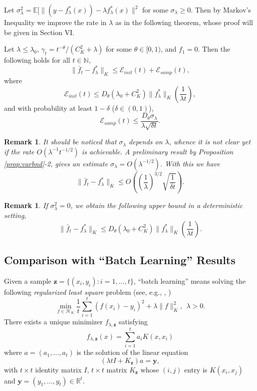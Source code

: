 \documentclass[twoside,twocolumn,journal]{IEEEtran}
\newtheorem{rem}[thm]{Remark}
\newenvironment{mainthm}[1][Main Theorem]{\medskip \noindent {\bf #1.}\begin{em}}{\end{em}\medskip}
\def\N{{\mathbb N}}
\def\R{{\mathbb R}}        %
\def\E{{\mathbb E}}        %
\def\H{{\mathscr H}}
\def\y{{\mathbf y}}
\def\z{{\mathbf z}}
\def\Err{{\mathscr E}}
\begin{document}
\medskip

%
%

Let $\sigma^2_\lambda=\E[\|(y - f^\ast_\lambda(x)) - \lambda f^\ast_\lambda(x)\|^2$ for some $\sigma_\lambda \geq 0$. Then by Markov's Inequality we
improve the rate in $\lambda$ as in the following theorem, whose proof will be given in Section VI.

\begin{mainthm}[Theorem B*]
Let $\lambda\leq \lambda_0$, $\gamma_t = t^{-\theta}/(C^2_K + \lambda)$ for some $\theta\in [0,1)$, and $f_1=0$.
Then the following holds for all $t\in \N$,
\[ \| \bar{f}_t - f^\ast_\lambda \|_K \leq \Err_{init}(t) + \Err_{samp}(t), \]
where
\[ \Err_{init}(t)\leq D_\theta(\lambda_0+C^2_K) \|f^\ast_\lambda\|_K \left( \frac{1}{\lambda t} \right), \]
and with probability at least $1-\delta$ ($\delta\in (0,1)$),
\[ \Err_{samp}(t) \leq \frac{D_\theta \sigma_\lambda}{ \lambda \sqrt{\delta t}}. \]
\end{mainthm}

\begin{rem} It should be noticed that $\sigma_\lambda$ depends on $\lambda$, whence it is not clear yet if the rate $O(\lambda^{-1}t^{-1/2})$ is
achievable. A preliminary result by Proposition \ref{prop:varbnd}-2, gives an estimate $\sigma_\lambda=O(\lambda^{-1/2})$.
With this we have
\[ \|\bar{f}_t - f^\ast_\lambda\|_K \leq O\left(\left(\frac{1}{\lambda}\right)^{3/2}\sqrt{\frac{1}{\delta  t}}\right). \]
\end{rem}

\medskip

\begin{rem}
If $\sigma^2_\lambda=0$, we obtain the following upper bound in a deterministic setting,
\[ \| \bar{f}_t - f^\ast_\lambda \|_K \leq D_\theta(\lambda_0+C^2_K) \|f^\ast_\lambda\|_K \left( \frac{1}{\lambda t} \right). \]
\end{rem}


\subsection{Comparison with ``Batch Learning'' Results}


Given a sample $\z=\{(x_i,y_i):i=1,\ldots,t\}$, ``batch learning'' means solving the following
\emph{regularized least square} problem (see, e.g., \cite{EvgPonPog99},
\cite{CucSma02})
\[ \min_{f\in \H_K} \frac{1}{t}\sum_{i=1}^t (f(x_i)-y_i)^2 + \lambda \|f\|^2_K, \ \ \lambda>0. \]
There exists a unique minimizer $f_{\lambda,\z}$ satisfying
\[ f_{\lambda,\z}(x)= \sum_{i=1}^t a_i K(x,x_i) \]
where $a=(a_1,\ldots,a_t)$ is the solution of the linear equation
\[ (\lambda t I + K_\z) a = \y, \]
with $t\times t$ identity matrix $I$, $t\times t$ matrix $K_\z$ whose $(i,j)$ entry is $K(x_i,x_j)$ and $ \y=(y_1,\ldots,y_t)\in \R^t$.
\end{document}
